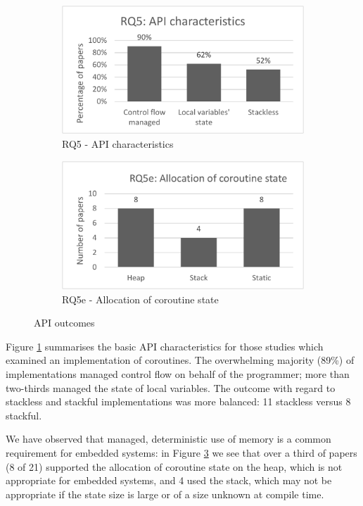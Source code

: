 \documentclass[format=acmsmall, review=false, screen=false]{acmart}
\begin{document}
\begin{figure}[h]
	\centering
	\begin{subfigure}[h]{0.46\textwidth}
		\centering
		\includegraphics[width=\textwidth]{RQ5-API-characteristics}
		\caption{RQ5 - API characteristics}
		\label{fig:rq5}
	\end{subfigure}
	\begin{subfigure}[h]{0.46\textwidth}
		\centering
		\includegraphics[width=\textwidth]{RQ5e-Allocation-of-coroutine-state}
		\caption{RQ5e - Allocation of coroutine state}
		\label{fig:rq5e}
	\end{subfigure}
	\caption{API outcomes}
\end{figure}

Figure \ref{fig:rq5} summarises the basic API characteristics for those studies which examined an implementation of coroutines. The overwhelming majority (89\%) of implementations managed control flow on behalf of the programmer; more than two-thirds managed the state of local variables. The outcome with regard to stackless and stackful implementations was more balanced: 11 stackless versus 8 stackful.

We have observed that managed, deterministic use of memory is a common requirement for embedded systems: in Figure \ref{fig:rq5e} we see that over a third of papers (8 of 21) supported the allocation of coroutine state on the heap, which is not appropriate for embedded systems, and 4 used the stack, which may not be appropriate if the state size is large or of a size unknown at compile time.
\end{document}
